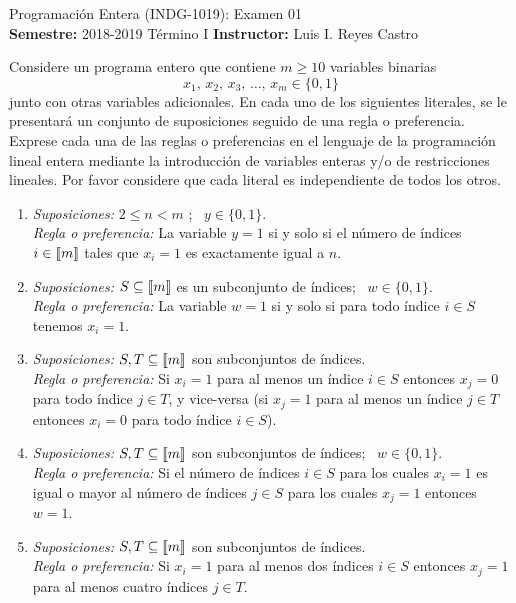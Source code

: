 \documentclass[ a4paper, twoside, 11pt]{article}
\newcommand{\numero}{01}
\begin{document}
\allowdisplaybreaks



\begin{center}
\Large Programaci\'on Entera (INDG-1019): Examen \numero \\[1ex]
\small \textbf{Semestre:} 2018-2019 T\'ermino I \qquad
\textbf{Instructor:} Luis I. Reyes Castro
\end{center}
\fullskip

\begin{problem}
Considere un programa entero que contiene $m \geq 10$ variables binarias
\[
x_1, \, x_2, \, x_3, \, \dots, \, x_m \in \{ 0, 1 \}
\]
junto con otras variables adicionales. En cada uno de los siguientes literales, se le presentar\'a un conjunto de suposiciones seguido de una regla o preferencia. Exprese cada una de las reglas o preferencias en el lenguaje de la programaci\'on lineal entera mediante la introducci\'on de variables enteras y/o de restricciones lineales. Por favor considere que cada literal es independiente de todos los otros. 
\begin{enumerate}[label=\alph*)]
\item \emph{Suposiciones:} $2 \leq n < m$ ; \, $y \in \{ 0, 1\}$. \\
\emph{Regla o preferencia:} La variable $y = 1$ si y solo si el n\'umero de \'indices $i \in \llbracket m \rrbracket$ tales que $x_i = 1$ es exactamente igual a $n$. 

\item \emph{Suposiciones:} $S \subseteq \llbracket m \rrbracket$ es un subconjunto de \'indices; \, $w \in \{ 0, 1\}$. \\
\emph{Regla o preferencia:} La variable $w = 1$ si y solo si para todo \'indice $i \in S$ tenemos $x_i = 1$. 

\item \emph{Suposiciones:} $S, T \subseteq \llbracket m \rrbracket$ son subconjuntos de \'indices. \\
\emph{Regla o preferencia:} Si $x_i = 1$ para al menos un \'indice $i \in S$ entonces $x_j = 0$ para todo \'indice $j \in T$, y vice-versa (\ie si $x_j = 1$ para al menos un \'indice $j \in T$ entonces $x_i = 0$ para todo \'indice $i \in S$). 

\item \emph{Suposiciones:} $S, T \subseteq \llbracket m \rrbracket$ son subconjuntos de \'indices; \, $w \in \{ 0, 1\}$. \\
\emph{Regla o preferencia:} Si el n\'umero de \'indices $i \in S$ para los cuales $x_i = 1$ es igual o mayor al n\'umero de \'indices $j \in S$ para los cuales $x_j = 1$ entonces $w = 1$. 

\item \emph{Suposiciones:} $S, T \subseteq \llbracket m \rrbracket$ son subconjuntos de \'indices. \\
\emph{Regla o preferencia:} Si $x_i = 1$ para al menos dos \'indices $i \in S$ entonces $x_j = 1$ para al menos cuatro \'indices $j \in T$. 

\end{enumerate}
\QED

\end{problem}
\fullskip
\end{document}
